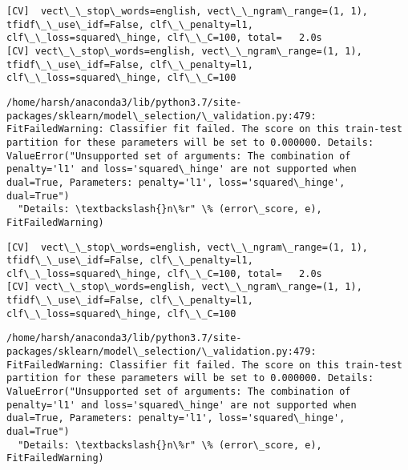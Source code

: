 \documentclass[11pt]{article}
\begin{document}
    \begin{Verbatim}[commandchars=\\\{\}]
[CV]  vect\_\_stop\_words=english, vect\_\_ngram\_range=(1, 1), tfidf\_\_use\_idf=False, clf\_\_penalty=l1, clf\_\_loss=squared\_hinge, clf\_\_C=100, total=   2.0s
[CV] vect\_\_stop\_words=english, vect\_\_ngram\_range=(1, 1), tfidf\_\_use\_idf=False, clf\_\_penalty=l1, clf\_\_loss=squared\_hinge, clf\_\_C=100 

    \end{Verbatim}

    \begin{Verbatim}[commandchars=\\\{\}]
/home/harsh/anaconda3/lib/python3.7/site-packages/sklearn/model\_selection/\_validation.py:479: FitFailedWarning: Classifier fit failed. The score on this train-test partition for these parameters will be set to 0.000000. Details: 
ValueError("Unsupported set of arguments: The combination of penalty='l1' and loss='squared\_hinge' are not supported when dual=True, Parameters: penalty='l1', loss='squared\_hinge', dual=True")
  "Details: \textbackslash{}n\%r" \% (error\_score, e), FitFailedWarning)

    \end{Verbatim}

    \begin{Verbatim}[commandchars=\\\{\}]
[CV]  vect\_\_stop\_words=english, vect\_\_ngram\_range=(1, 1), tfidf\_\_use\_idf=False, clf\_\_penalty=l1, clf\_\_loss=squared\_hinge, clf\_\_C=100, total=   2.0s
[CV] vect\_\_stop\_words=english, vect\_\_ngram\_range=(1, 1), tfidf\_\_use\_idf=False, clf\_\_penalty=l1, clf\_\_loss=squared\_hinge, clf\_\_C=100 

    \end{Verbatim}

    \begin{Verbatim}[commandchars=\\\{\}]
/home/harsh/anaconda3/lib/python3.7/site-packages/sklearn/model\_selection/\_validation.py:479: FitFailedWarning: Classifier fit failed. The score on this train-test partition for these parameters will be set to 0.000000. Details: 
ValueError("Unsupported set of arguments: The combination of penalty='l1' and loss='squared\_hinge' are not supported when dual=True, Parameters: penalty='l1', loss='squared\_hinge', dual=True")
  "Details: \textbackslash{}n\%r" \% (error\_score, e), FitFailedWarning)

    \end{Verbatim}
\end{document}
